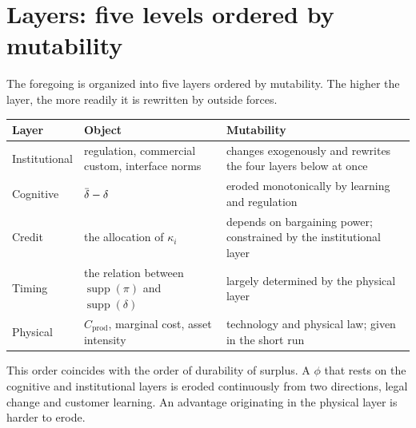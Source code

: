 \section{Layers: five levels ordered by mutability}
\label{sec:layers}

The foregoing is organized into five layers ordered by mutability. The higher the layer, the
more readily it is rewritten by outside forces.

\begin{center}
\begin{tabularx}{\textwidth}{@{}llX@{}}
\toprule
Layer & Object & Mutability \\
\midrule
Institutional & regulation, commercial custom, interface norms & changes exogenously and rewrites the four layers below at once \\
Cognitive & $\dbar-\delta$ & eroded monotonically by learning and regulation \\
Credit & the allocation of $\kappa_i$ & depends on bargaining power; constrained by the institutional layer \\
Timing & the relation between $\operatorname{supp}(\pi)$ and $\operatorname{supp}(\delta)$ & largely determined by the physical layer \\
Physical & $C_{\mathrm{prod}}$, marginal cost, asset intensity & technology and physical law; given in the short run \\
\bottomrule
\end{tabularx}
\label{tab:five-layers}
\end{center}

This order coincides with the order of durability of surplus. A $\phi$ that rests on the
cognitive and institutional layers is eroded continuously from two directions, legal change
and customer learning. An advantage originating in the physical layer is harder to erode.

